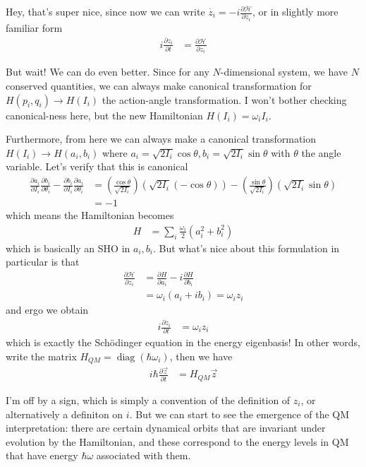 \documentclass[12pt]{report}
\newcommand{\pd}[2]{\frac{\partial#1}{\partial#2}}
\DeclareMathOperator{\diag}{diag}
\begin{document}
Hey, that's super nice, since now we can write $\dot{z_i} =
-i\pd{\mathcal{H}}{z_i}$, or in slightly more familiar form
\begin{align}
    i\pd{z_i}{t} &= \pd{\mathcal{H}}{z_i}
\end{align}

But wait! We can do even better. Since for any $N$-dimensional system, we have
$N$ conserved quantities, we can always make canonical transformation for
$H(p_i, q_i) \to H(I_i)$ the action-angle transformation. I won't bother
checking canonical-ness here, but the new Hamiltonian $H(I_i) = \omega_iI_i$.

Furthermore, from here we can always make a canonical transformation $H(I_i) \to
H(a_i, b_i)$ where $a_i = \sqrt{2I_i}\cos\theta, b_i = \sqrt{2I_i}\sin\theta$
with $\theta$ the angle variable.  Let's verify that this is canonical
\begin{align}
    \pd{a_i}{I_i}\pd{b_i}{\theta_i} - \pd{b_i}{I_i}\pd{a_i}{\theta_i} &=
        \left( \frac{\cos\theta}{\sqrt{2I_i}} \right)
        \left( \sqrt{2I_i}(-\cos\theta) \right) -
        \left( \frac{\sin\theta}{\sqrt{2I_i}} \right)
        \left( \sqrt{2I_i}\sin\theta \right)\\
        &= -1
\end{align}
which means the Hamiltonian becomes
\begin{align}
    H &= \sum\limits_{i}^{}\frac{\omega_i}{2}(a_i^2 + b_i^2)
\end{align}
which is basically an SHO in $a_i, b_i$. But what's nice about this formulation
in particular is that
\begin{align}
    \pd{\mathcal{H}}{z_i} &= \pd{H}{a_i} - i\pd{H}{b_i}\\
    &= \omega_i(a_i + ib_i) = \omega_iz_i
\end{align}
and ergo we obtain
\begin{align}
    i\pd{z_i}{t} &= \omega_iz_i
\end{align}
which is exactly the Sch\"odinger equation in the energy eigenbasis! In other
words, write the matrix $H_{QM} = \diag(\hbar \omega_i)$, then we have
\begin{align}
    i\hbar \pd{\vec{z}}{t} &= H_{QM}\vec{z}\label{5.SE}
\end{align}

I'm off by a sign, which is simply a convention of the definition of $z_i$, or
alternatively a definiton on $i$. But we can start to see the emergence of the
QM interpretation: there are certain dynamical orbits that are invariant under
evolution by the Hamiltonian, and these correspond to the energy levels in QM
that have energy $\hbar \omega$ associated with them.
\end{document}
